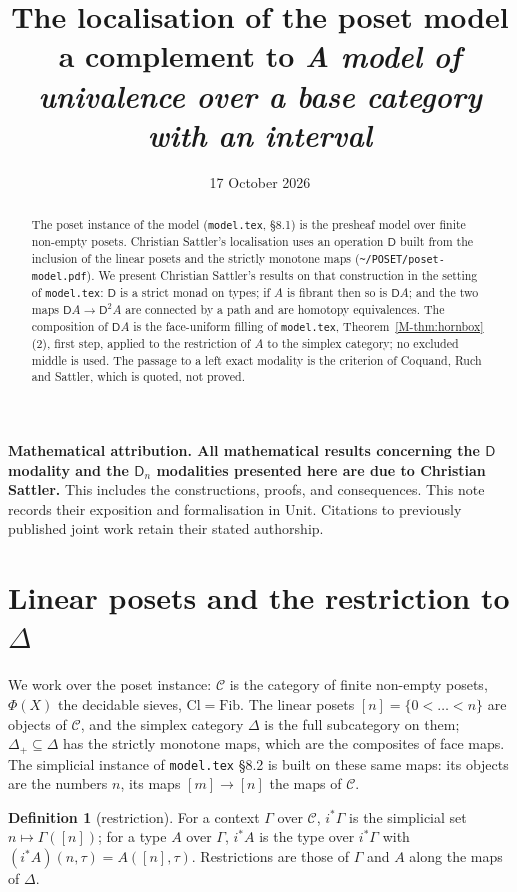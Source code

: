 \documentclass[11pt]{article}
\title{The localisation of the poset model\\[3pt]
\large a complement to \emph{A model of univalence over a base category with an interval}}
\author{}
\date{17 October 2026}
\newcommand{\C}{\mathcal{C}}
\newcommand{\Fib}{\mathrm{Fib}}
\newcommand{\Cl}{\mathrm{Cl}}
\newcommand{\D}{\mathsf{D}}
\theoremstyle{plain}
\theoremstyle{definition}
\newtheorem{definition}[theorem]{Definition}
\theoremstyle{remark}
\begin{document}
\maketitle

\noindent\textbf{Mathematical attribution. All mathematical results
concerning the $\D$ modality and the $\D_n$ modalities presented here are
due to Christian Sattler.} This includes the constructions, proofs, and
consequences. This note records their exposition and formalisation in
Unit. Citations to previously published joint work retain their stated
authorship.

\begin{abstract}
\noindent
The poset instance of the model (\texttt{model.tex}, §8.1) is the presheaf
model over finite non-empty posets. Christian Sattler's localisation uses an
operation $\D$ built from the inclusion of the linear posets and the strictly
monotone maps (\texttt{\textasciitilde/POSET/poset-model.pdf}). We present
Christian Sattler's results on that construction in the setting of
\texttt{model.tex}: $\D$ is a strict monad on types; if $A$ is fibrant then
so is $\D A$; and the two maps $\D A\to\D^2A$ are connected by a path and
are homotopy equivalences. The composition of $\D A$ is the face-uniform
filling of \texttt{model.tex}, Theorem~\ref{M-thm:hornbox}(2), first step, applied to the
restriction of $A$ to the simplex category; no excluded middle is used.
The passage to a left exact modality is the criterion of Coquand, Ruch and
Sattler, which is quoted, not proved.
\end{abstract}

\section{Linear posets and the restriction to $\Delta$}\label{sec:restr}

We work over the poset instance: $\C$ is the category of finite non-empty
posets, $\Phi(X)$ the decidable sieves, $\Cl=\Fib$. The linear posets
$[n]=\{0<\dots<n\}$ are objects of $\C$, and the simplex category $\Delta$
is the full subcategory on them; $\Delta_+\subseteq\Delta$ has the strictly
monotone maps, which are the composites of face maps. The simplicial
instance of \texttt{model.tex} §8.2 is built on these same maps: its objects
are the numbers $n$, its maps $[m]\to[n]$ the maps of $\C$.

\begin{definition}[restriction]
For a context $\Gamma$ over $\C$, $i^*\Gamma$ is the simplicial set
$n\mapsto\Gamma([n])$; for a type $A$ over $\Gamma$, $i^*A$ is the type over
$i^*\Gamma$ with $(i^*A)(n,\tau)=A([n],\tau)$. Restrictions are those of
$\Gamma$ and $A$ along the maps of $\Delta$.
\end{definition}
\end{document}
